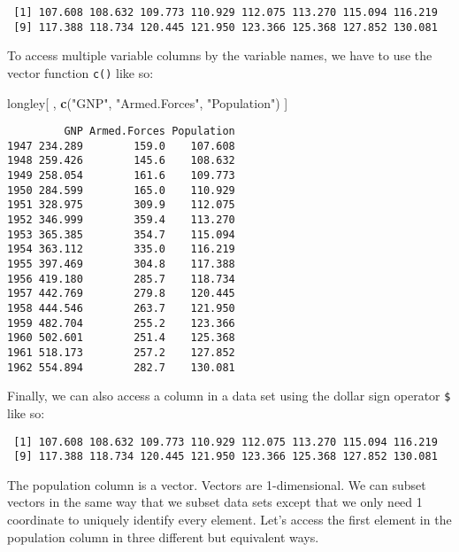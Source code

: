 \documentclass[]{article}
\newenvironment{Shaded}{\begin{snugshade}}{\end{snugshade}}
\newcommand{\KeywordTok}[1]{\textcolor[rgb]{0.13,0.29,0.53}{\textbf{#1}}}
\newcommand{\NormalTok}[1]{#1}
\newcommand{\OperatorTok}[1]{\textcolor[rgb]{0.81,0.36,0.00}{\textbf{#1}}}
\newcommand{\StringTok}[1]{\textcolor[rgb]{0.31,0.60,0.02}{#1}}
\begin{document}
\begin{verbatim}
 [1] 107.608 108.632 109.773 110.929 112.075 113.270 115.094 116.219
 [9] 117.388 118.734 120.445 121.950 123.366 125.368 127.852 130.081
\end{verbatim}

To access multiple variable columns by the variable names, we have to use the vector function \texttt{c()} like so:

\begin{Shaded}
\begin{Highlighting}[]
\NormalTok{longley[ , }\KeywordTok{c}\NormalTok{(}\StringTok{"GNP"}\NormalTok{, }\StringTok{"Armed.Forces"}\NormalTok{, }\StringTok{"Population"}\NormalTok{) ]}
\end{Highlighting}
\end{Shaded}

\begin{verbatim}
         GNP Armed.Forces Population
1947 234.289        159.0    107.608
1948 259.426        145.6    108.632
1949 258.054        161.6    109.773
1950 284.599        165.0    110.929
1951 328.975        309.9    112.075
1952 346.999        359.4    113.270
1953 365.385        354.7    115.094
1954 363.112        335.0    116.219
1955 397.469        304.8    117.388
1956 419.180        285.7    118.734
1957 442.769        279.8    120.445
1958 444.546        263.7    121.950
1959 482.704        255.2    123.366
1960 502.601        251.4    125.368
1961 518.173        257.2    127.852
1962 554.894        282.7    130.081
\end{verbatim}

Finally, we can also access a column in a data set using the dollar sign operator \texttt{\$} like so:

\begin{Shaded}
\end{Shaded}

\begin{verbatim}
 [1] 107.608 108.632 109.773 110.929 112.075 113.270 115.094 116.219
 [9] 117.388 118.734 120.445 121.950 123.366 125.368 127.852 130.081
\end{verbatim}

The population column is a vector. Vectors are 1-dimensional. We can subset vectors in the same way that we subset data sets except that we only need 1 coordinate to uniquely identify every element. Let's access the first element in the population column in three different but equivalent ways.
\end{document}
